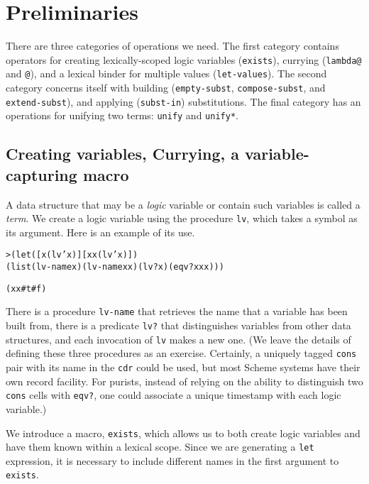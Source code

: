 \section{Preliminaries}

There are three categories of operations we need.  The first category
contains operators for creating lexically-scoped logic variables
(\texttt{exists}), currying (\texttt{lambda@} and \texttt{@}), and a
lexical binder for multiple values (\texttt{let-values}).  The second
category concerns itself with building (\texttt{empty-subst},
\texttt{compose-subst}, and \texttt{extend-subst}), and applying
(\texttt{subst-in}) substitutions.  The final category has an
operations for unifying two terms: \texttt{unify} and \texttt{unify*}.

\subsection{Creating variables, Currying, a variable-capturing macro}

A data structure that may be a \emph{logic} variable or contain such
variables is called a \emph{term}.  We create a logic variable using
the procedure \texttt{lv}, which takes a symbol as its argument. Here
is an example of its use.

\begin{alltt}
> (let ([x (lv 'x)] [xx (lv 'x)])
    (list (lv-name x) (lv-name xx) (lv? x) (eqv? x xx)))

(x x #t #f)
\end{alltt}

\noindent
There is a procedure \texttt{lv-name} that retrieves the name that a
variable has been built from, there is a predicate \texttt{lv?} that
distinguishes variables from other data structures, and each
invocation of \texttt{lv} makes a new one.  (We leave the details of
defining these three procedures as an exercise.  Certainly, a uniquely
tagged \texttt{cons} pair with its name in the \texttt{cdr} could be
used, but most Scheme systems have their own record facility.  For
purists, instead of relying on the ability to distinguish two
\texttt{cons} cells with \texttt{eqv?}, one could associate a unique
timestamp with each logic variable.)

We introduce a macro, \texttt{exists}, which allows us to both create
logic variables and have them known within a lexical scope.  Since
we are generating a \texttt{let} expression, it is necessary to
include different names in the first argument to \texttt{exists}.

